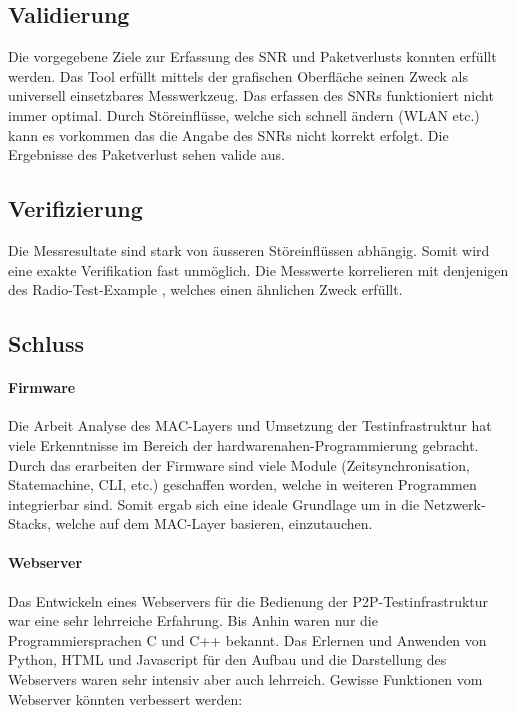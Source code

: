 \subsection{Validierung}\label{subsec:P2PValidierung}

Die vorgegebene Ziele zur Erfassung des SNR und Paketverlusts konnten erfüllt werden. Das Tool erfüllt mittels der grafischen Oberfläche seinen Zweck als universell einsetzbares Messwerkzeug. Das erfassen des SNRs funktioniert nicht immer optimal. Durch Störeinflüsse, welche sich schnell ändern (WLAN etc.) kann es vorkommen das die Angabe des SNRs nicht korrekt erfolgt. Die Ergebnisse des Paketverlust sehen valide aus. 

\subsection{Verifizierung}\label{subsec:P2PVerifizierung}

Die Messresultate sind stark von äusseren Störeinflüssen abhängig. Somit wird eine exakte Verifikation fast unmöglich. Die Messwerte korrelieren mit denjenigen des Radio-Test-Example \cite{nrf_connect_sdk_radio_test_example_2020}, welches einen ähnlichen Zweck erfüllt. 

\subsection{Schluss}\label{subsec:Schluss}
\paragraph{Firmware}
Die Arbeit Analyse des MAC-Layers und Umsetzung der Testinfrastruktur hat viele Erkenntnisse im Bereich der hardwarenahen-Programmierung gebracht. Durch das erarbeiten der Firmware sind viele Module (Zeitsynchronisation, Statemachine, CLI, etc.) geschaffen worden, welche in weiteren Programmen integrierbar sind. Somit ergab sich eine ideale Grundlage um in die Netzwerk-Stacks, welche auf dem MAC-Layer basieren, einzutauchen. 

\paragraph{Webserver}
Das Entwickeln eines Webservers für die Bedienung der P2P-Testinfrastruktur war eine sehr lehrreiche Erfahrung. Bis Anhin waren nur die Programmiersprachen C und C++ bekannt. Das Erlernen und Anwenden von Python, HTML und Javascript für den Aufbau und die Darstellung des Webservers waren sehr intensiv aber auch lehrreich. Gewisse Funktionen vom Webserver könnten verbessert werden:

